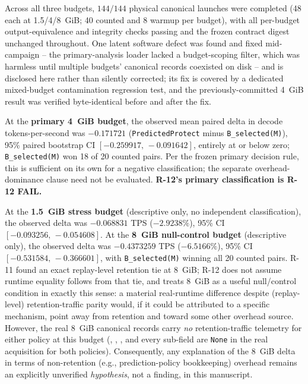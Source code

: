Across all three budgets, $144/144$ physical canonical launches were
completed (48 each at 1.5/4/8~GiB; 40 counted and 8 warmup per budget),
with all per-budget output-equivalence and integrity checks passing and the
frozen contract digest unchanged throughout. One latent software defect was
found and fixed mid-campaign -- the primary-analysis loader lacked a
budget-scoping filter, which was harmless until multiple budgets' canonical
records coexisted on disk -- and is disclosed here rather than silently
corrected; its fix is covered by a dedicated mixed-budget contamination
regression test, and the previously-committed 4~GiB result was verified
byte-identical before and after the fix.

At the \textbf{primary 4~GiB budget}, the observed mean paired delta in
decode tokens-per-second was $\mathbf{-0.171721}$
(\texttt{PredictedProtect} minus \texttt{B\_selected(M)}), 95\% paired
bootstrap CI $[-0.259917,\,-0.091642]$, entirely at or below zero;
\texttt{B\_selected(M)} won 18 of 20 counted pairs. Per the frozen primary
decision rule, this is sufficient on its own for a negative classification;
the separate overhead-dominance clause need not be evaluated. \textbf{R-12's
primary classification is R-12 FAIL.}

At the \textbf{1.5~GiB stress budget} (descriptive only, no independent
classification), the observed delta was $-0.068831$ TPS ($-2.9238\%$), 95\%
CI $[-0.093256,\,-0.054608]$. At the \textbf{8~GiB null-control budget}
(descriptive only), the observed delta was $-0.4373259$ TPS ($-6.5166\%$),
95\% CI $[-0.531584,\,-0.366601]$, with \texttt{B\_selected(M)} winning all
20 counted pairs. R-11 found an exact replay-level retention tie at
8~GiB; R-12 does not assume runtime equality follows from that tie, and
treats 8~GiB as a useful null/control condition in exactly this sense: a
material real-runtime difference despite (replay-level) retention-traffic
parity would, if it could be attributed to a specific mechanism, point away
from retention and toward some other overhead source. However, the real
8~GiB canonical records carry \emph{no} retention-traffic telemetry for
either policy at this budget (,
, , and every
 sub-field are \texttt{None} in the real
acquisition for both policies). Consequently, any explanation of the 8~GiB
delta in terms of non-retention (e.g., prediction-policy bookkeeping)
overhead remains an explicitly unverified \emph{hypothesis}, not a
finding, in this manuscript.

